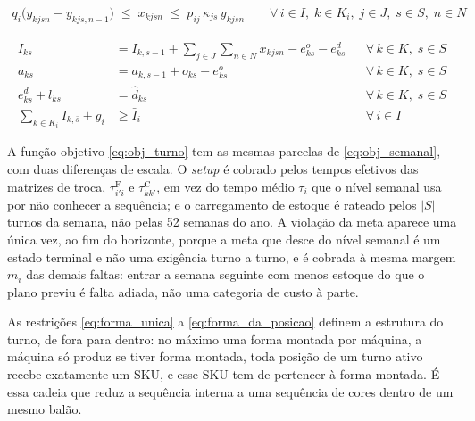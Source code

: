 \documentclass[fleqn,12pt,a4paper]{article}
\begin{document}
\begin{ceqn}
\begin{equation}
\begin{aligned}
q_{i} \bigl( y_{kjsn} - y_{kjs,n-1} \bigr) \;\le\; x_{kjsn} \;\le\; p_{ij}\, \kappa_{js}\, y_{kjsn}
    \qquad \forall\, i \in I,\; k \in K_i,\; j \in J,\; s \in S,\; n \in N
\end{aligned}
\label{eq:lote_minimo_turno}
\end{equation}
\end{ceqn}

\begin{align}
I_{ks} &= I_{k,s-1} + \sum_{j \in J}\sum_{n \in N} x_{kjsn} - e^{o}_{ks} - e^{d}_{ks}
    && \forall\, k \in K,\; s \in S \label{eq:balanco_turno} \\
a_{ks} &= a_{k,s-1} + o_{ks} - e^{o}_{ks}
    && \forall\, k \in K,\; s \in S \label{eq:atraso_turno} \\
e^{d}_{ks} + l_{ks} &= \hat{d}_{ks}
    && \forall\, k \in K,\; s \in S \label{eq:previsao_turno} \\
\sum_{k \in K_i} I_{k,\bar{s}} + g_{i} &\ge \bar{I}_{i}
    && \forall\, i \in I \label{eq:meta_final}
\end{align}

A função objetivo \eqref{eq:obj_turno} tem as mesmas parcelas de \eqref{eq:obj_semanal}, com duas diferenças de escala. O \textit{setup} é cobrado pelos tempos efetivos das matrizes de troca, $\tau^{\mathrm{F}}_{i'i}$ e $\tau^{\mathrm{C}}_{kk'}$, em vez do tempo médio $\tau_i$ que o nível semanal usa por não conhecer a sequência; e o carregamento de estoque é rateado pelos $|S|$ turnos da semana, não pelas 52 semanas do ano. A violação da meta aparece uma única vez, ao fim do horizonte, porque a meta que desce do nível semanal é um estado terminal e não uma exigência turno a turno, e é cobrada à mesma margem $m_i$ das demais faltas: entrar a semana seguinte com menos estoque do que o plano previu é falta adiada, não uma categoria de custo à parte.

As restrições \eqref{eq:forma_unica} a \eqref{eq:forma_da_posicao} definem a estrutura do turno, de fora para dentro: no máximo uma forma montada por máquina, a máquina só produz se tiver forma montada, toda posição de um turno ativo recebe exatamente um SKU, e esse SKU tem de pertencer à forma montada. É essa cadeia que reduz a sequência interna a uma sequência de cores dentro de um mesmo balão.
\end{document}
